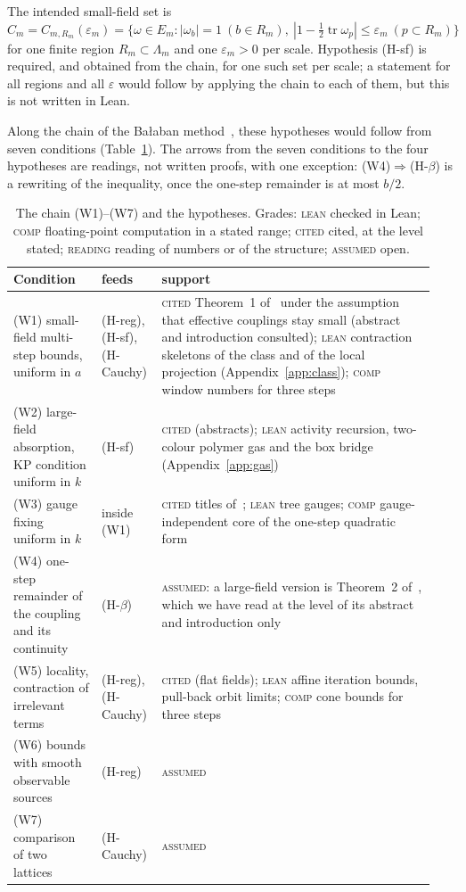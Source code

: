 \documentclass[11pt,a4paper]{article}
\theoremstyle{definition}
\theoremstyle{remark}
\newcommand{\tagL}{\textsc{lean}}
\newcommand{\tagC}{\textsc{comp}}
\newcommand{\tagK}{\textsc{cited}}
\newcommand{\tagR}{\textsc{reading}}
\newcommand{\tagA}{\textsc{assumed}}
\begin{document}
The intended small-field set is $C_m=C_{m,R_m}(\varepsilon_m)=\{\omega\in E_m:|\omega_b|=1\ (b\in R_m),\ |1-\tfrac12\operatorname{tr}\omega_p|\le\varepsilon_m\ (p\subset R_m)\}$ for one finite region $R_m\subset\Lambda_m$ and one $\varepsilon_m>0$ per scale. Hypothesis (H-sf) is required, and obtained from the chain, for one such set per scale; a statement for all regions and all $\varepsilon$ would follow by applying the chain to each of them, but this is not written in Lean.

Along the chain of the Bałaban method~\cite{B119,B122a,B122b}, these hypotheses would follow from seven conditions (Table~\ref{tab:chain}). The arrows from the seven conditions to the four hypotheses are readings, not written proofs, with one exception: (W4)$\Rightarrow$(H-$\beta$) is a rewriting of the inequality, once the one-step remainder is at most $b/2$.

\begin{table}[ht]\centering\small
\caption{The chain (W1)--(W7) and the hypotheses. Grades: \tagL{} checked in Lean; \tagC{} floating-point computation in a stated range; \tagK{} cited, at the level stated; \tagR{} reading of numbers or of the structure; \tagA{} open.}\label{tab:chain}
\begin{tabular}{@{}>{\raggedright\arraybackslash}p{0.2\linewidth}>{\raggedright\arraybackslash}p{0.12\linewidth}>{\raggedright\arraybackslash}p{0.62\linewidth}@{}}\toprule
Condition & feeds & support\\\midrule
(W1) small-field multi-step bounds, uniform in $a$ & (H-reg), (H-sf), (H-Cauchy) & \tagK{} Theorem~1 of~\cite{B122b} under the assumption that effective couplings stay small (abstract and introduction consulted); \tagL{} contraction skeletons of the class and of the local projection (Appendix~\ref{app:class}); \tagC{} window numbers for three steps\\
(W2) large-field absorption, KP condition uniform in $k$ & (H-sf) & \tagK{} \cite{B119,B122a} (abstracts); \tagL{} activity recursion, two-colour polymer gas and the box bridge (Appendix~\ref{app:gas})\\
(W3) gauge fixing uniform in $k$ & inside (W1) & \tagK{} titles of~\cite{B98,B99}; \tagL{} tree gauges; \tagC{} gauge-independent core of the one-step quadratic form\\
(W4) one-step remainder of the coupling and its continuity & (H-$\beta$) & \tagA{}: a large-field version is Theorem~2 of~\cite{B122b}, which we have read at the level of its abstract and introduction only\\
(W5) locality, contraction of irrelevant terms & (H-reg), (H-Cauchy) & \tagK{} \cite{BBS} (flat fields); \tagL{} affine iteration bounds, pull-back orbit limits; \tagC{} cone bounds for three steps\\
(W6) bounds with smooth observable sources & (H-reg) & \tagA\\
(W7) comparison of two lattices & (H-Cauchy) & \tagA\\\bottomrule
\end{tabular}
\end{table}
\end{document}
